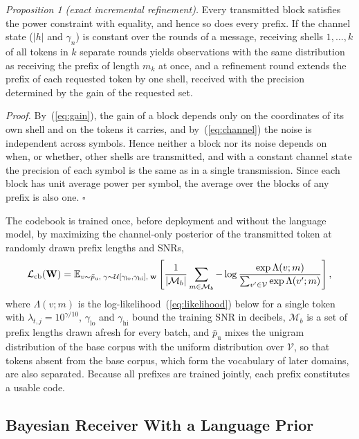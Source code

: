 \emph{Proposition 1 (exact incremental refinement).} Every transmitted block satisfies the power constraint with equality, and hence so does every prefix. If the channel state ($|h|$ and $\gamma_n$) is constant over the rounds of a message, receiving shells $1,\dots,k$ of all tokens in $k$ separate rounds yields observations with the same distribution as receiving the prefix of length $m_k$ at once, and a refinement round extends the prefix of each requested token by one shell, received with the precision determined by the gain of the requested set.

\emph{Proof.} By~(\ref{eq:gain}), the gain of a block depends only on the coordinates of its own shell and on the tokens it carries, and by~(\ref{eq:channel}) the noise is independent across symbols. Hence neither a block nor its noise depends on when, or whether, other shells are transmitted, and with a constant channel state the precision of each symbol is the same as in a single transmission. Since each block has unit average power per symbol, the average over the blocks of any prefix is also one. $\square$

The codebook is trained once, before deployment and without the language model, by maximizing the channel-only posterior of the transmitted token at randomly drawn prefix lengths and SNRs,
\begin{equation}
\mathcal{L}_\mathrm{cb}(\mathbf{W}) = \mathbb{E}_{v\sim\bar{p}_\mathrm{u},\;\gamma\sim\mathcal{U}[\gamma_\mathrm{lo},\gamma_\mathrm{hi}],\;\mathbf{w}}\left[\frac{1}{|\mathcal{M}_b|}\sum_{m\in\mathcal{M}_b}-\log\frac{\exp\Lambda(v;m)}{\sum_{v'\in\mathcal{V}}\exp\Lambda(v';m)}\right],
\label{eq:codebook-loss}
\end{equation}
where $\Lambda(v;m)$ is the log-likelihood~(\ref{eq:likelihood}) below for a single token with $\lambda_{t,j} = 10^{\gamma/10}$, $\gamma_\mathrm{lo}$ and $\gamma_\mathrm{hi}$ bound the training SNR in decibels, $\mathcal{M}_b$ is a set of prefix lengths drawn afresh for every batch, and $\bar{p}_\mathrm{u}$ mixes the unigram distribution of the base corpus with the uniform distribution over $\mathcal{V}$, so that tokens absent from the base corpus, which form the vocabulary of later domains, are also separated. Because all prefixes are trained jointly, each prefix constitutes a usable code.

\subsection{Bayesian Receiver With a Language Prior}
\label{sec:method-receiver}

